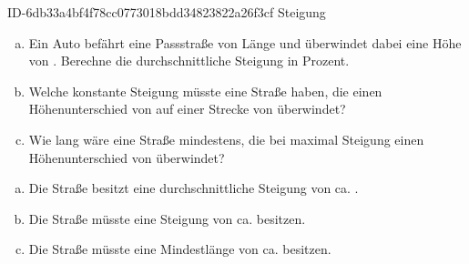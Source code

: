\begin{exercise}
      {ID-6db33a4bf4f78cc0773018bdd34823822a26f3cf}
      {Steigung}
  \ifproblem\problem\par
    \begin{enumerate}[a)]
      \item Ein Auto befährt eine Passstraße von  Länge und überwindet
            dabei eine Höhe von . Berechne die durchschnittliche
            Steigung in Prozent.
      \item Welche konstante Steigung müsste eine Straße haben, die einen
            Höhenunterschied von  auf einer Strecke von
             überwindet?
      \item Wie lang wäre eine Straße mindestens, die bei maximal 
            Steigung einen Höhenunterschied von  überwindet?
    \end{enumerate}
  \fi
  \ifoutline\outline\par
  \fi
  \ifoutcome\outcome\par
    \begin{enumerate}[a)]
      \item Die Straße besitzt eine durchschnittliche Steigung von ca. .
      \item Die Straße müsste eine Steigung von ca.  besitzen.
      \item Die Straße müsste eine Mindestlänge von ca.  besitzen.
    \end{enumerate}
  \fi
\end{exercise}

